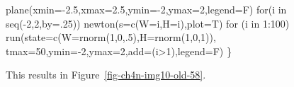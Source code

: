 \documentclass[
  a4paper,
  DIV=11,
  numbers=noendperiod,
  oneside]{scrreprt}
\newenvironment{Shaded}{\begin{snugshade}}{\end{snugshade}}
\newcommand{\AttributeTok}[1]{\textcolor[rgb]{0.40,0.45,0.13}{#1}}
\newcommand{\ControlFlowTok}[1]{\textcolor[rgb]{0.00,0.23,0.31}{#1}}
\newcommand{\DecValTok}[1]{\textcolor[rgb]{0.68,0.00,0.00}{#1}}
\newcommand{\FloatTok}[1]{\textcolor[rgb]{0.68,0.00,0.00}{#1}}
\newcommand{\FunctionTok}[1]{\textcolor[rgb]{0.28,0.35,0.67}{#1}}
\newcommand{\NormalTok}[1]{\textcolor[rgb]{0.00,0.23,0.31}{#1}}
\newcommand{\SpecialCharTok}[1]{\textcolor[rgb]{0.37,0.37,0.37}{#1}}
\begin{document}
\begin{Shaded}
\begin{Highlighting}[]
\FunctionTok{plane}\NormalTok{(}\AttributeTok{xmin=}\SpecialCharTok{{-}}\FloatTok{2.5}\NormalTok{,}\AttributeTok{xmax=}\FloatTok{2.5}\NormalTok{,}\AttributeTok{ymin=}\SpecialCharTok{{-}}\DecValTok{2}\NormalTok{,}\AttributeTok{ymax=}\DecValTok{2}\NormalTok{,}\AttributeTok{legend=}\NormalTok{F)}
\ControlFlowTok{for}\NormalTok{(i }\ControlFlowTok{in} \FunctionTok{seq}\NormalTok{(}\SpecialCharTok{{-}}\DecValTok{2}\NormalTok{,}\DecValTok{2}\NormalTok{,}\AttributeTok{by=}\NormalTok{.}\DecValTok{25}\NormalTok{)) }\FunctionTok{newton}\NormalTok{(}\AttributeTok{s=}\FunctionTok{c}\NormalTok{(}\AttributeTok{W=}\NormalTok{i,}\AttributeTok{H=}\NormalTok{i),}\AttributeTok{plot=}\NormalTok{T)}
\ControlFlowTok{for}\NormalTok{ (i }\ControlFlowTok{in} \DecValTok{1}\SpecialCharTok{:}\DecValTok{100}\NormalTok{)}
  \FunctionTok{run}\NormalTok{(}\AttributeTok{state=}\FunctionTok{c}\NormalTok{(}\AttributeTok{W=}\FunctionTok{rnorm}\NormalTok{(}\DecValTok{1}\NormalTok{,}\DecValTok{0}\NormalTok{,.}\DecValTok{5}\NormalTok{),}\AttributeTok{H=}\FunctionTok{rnorm}\NormalTok{(}\DecValTok{1}\NormalTok{,}\DecValTok{0}\NormalTok{,}\DecValTok{1}\NormalTok{)), }\AttributeTok{tmax=}\DecValTok{50}\NormalTok{,}\AttributeTok{ymin=}\SpecialCharTok{{-}}\DecValTok{2}\NormalTok{,}\AttributeTok{ymax=}\DecValTok{2}\NormalTok{,}\AttributeTok{add=}\NormalTok{(i}\SpecialCharTok{\textgreater{}}\DecValTok{1}\NormalTok{),}\AttributeTok{legend=}\NormalTok{F)}
\NormalTok{\}}
\end{Highlighting}
\end{Shaded}

This results in Figure~\ref{fig-ch4n-img10-old-58}.
\end{document}
